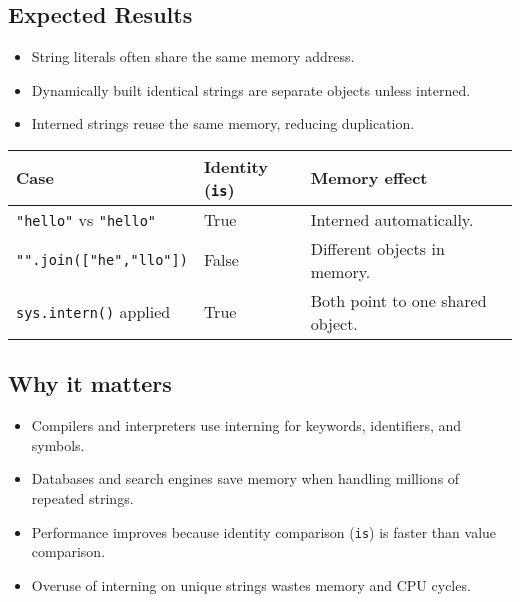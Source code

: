 \documentclass[
  letterpaper,
  DIV=11,
  numbers=noendperiod]{scrreprt}
\providecommand{\tightlist}{%
  \setlength{\itemsep}{0pt}\setlength{\parskip}{0pt}}
\begin{document}
\subsection{Expected Results}\label{expected-results-1}

\begin{itemize}
\tightlist
\item
  String literals often share the same memory address.
\item
  Dynamically built identical strings are separate objects unless
  interned.
\item
  Interned strings reuse the same memory, reducing duplication.
\end{itemize}

\begin{longtable}[]{@{}
  >{\raggedright\arraybackslash}p{}
  >{\raggedright\arraybackslash}p{}
  >{\raggedright\arraybackslash}p{}@{}}
\toprule\noalign{}
\begin{minipage}[b]{\linewidth}\raggedright
Case
\end{minipage} & \begin{minipage}[b]{\linewidth}\raggedright
Identity (\texttt{is})
\end{minipage} & \begin{minipage}[b]{\linewidth}\raggedright
Memory effect
\end{minipage} \\
\midrule\noalign{}
\endhead
\bottomrule\noalign{}
\endlastfoot
\texttt{"hello"} vs \texttt{"hello"} & True & Interned automatically. \\
\texttt{"".join({[}"he","llo"{]})} & False & Different objects in
memory. \\
\texttt{sys.intern()} applied & True & Both point to one shared
object. \\
\end{longtable}

\subsection{Why it matters}\label{why-it-matters-46}

\begin{itemize}
\tightlist
\item
  Compilers and interpreters use interning for keywords, identifiers,
  and symbols.
\item
  Databases and search engines save memory when handling millions of
  repeated strings.
\item
  Performance improves because identity comparison (\texttt{is}) is
  faster than value comparison.
\item
  Overuse of interning on unique strings wastes memory and CPU cycles.
\end{itemize}
\end{document}
